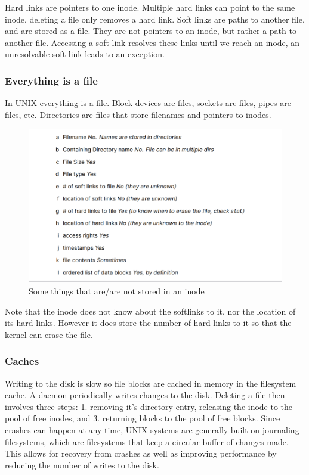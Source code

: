 \documentclass[../notes.tex]{subfiles}
\begin{document}
Hard links are pointers to one inode. Multiple hard links can point to the same inode, deleting a file only removes a hard link.
Soft links are paths to another file, and are stored as a file. They are not pointers to an inode, but rather a path to another file. Accessing a soft link resolves these links until we reach an inode, an unresolvable soft link leads to an exception.


\subsubsection{Everything is a file}

In UNIX everything is a file. Block devices are files, sockets are files, pipes are files, etc. Directories are files that store filenames and pointers to inodes. 


\begin{figure}[H]
    \centering
    \includegraphics[width=0.8\linewidth]{img/image_2023-03-16-17-59-51.png}
    \caption{Some things that are/are not stored in an inode}
\end{figure}

Note that the inode does not know about the softlinks to it, nor the location of its hard links. However it does store the number of hard links to it so that the kernel can erase the file.

\subsubsection{Caches}

Writing to the disk is slow so file blocks are cached in memory in the filesystem cache. A daemon periodically writes changes to the disk.
Deleting a file then involves three steps: 1. removing it's directory entry, releasing the inode to the pool of free inodes, and 3. returning blocks to the pool of free blocks.
Since crashes can happen at any time, UNIX systems are generally built on journaling filesystems, which are filesystems that keep a circular buffer of changes made. This allows for recovery from crashes as well as improving performance by reducing the number of writes to the disk. 
\end{document}
